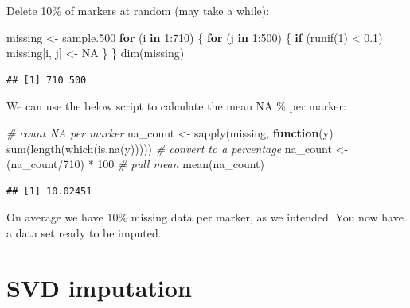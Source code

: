 \documentclass[
]{book}
\newenvironment{Shaded}{\begin{snugshade}}{\end{snugshade}}
\newcommand{\CommentTok}[1]{\textcolor[rgb]{0.56,0.35,0.01}{\textit{#1}}}
\newcommand{\ConstantTok}[1]{\textcolor[rgb]{0.00,0.00,0.00}{#1}}
\newcommand{\ControlFlowTok}[1]{\textcolor[rgb]{0.13,0.29,0.53}{\textbf{#1}}}
\newcommand{\DecValTok}[1]{\textcolor[rgb]{0.00,0.00,0.81}{#1}}
\newcommand{\FloatTok}[1]{\textcolor[rgb]{0.00,0.00,0.81}{#1}}
\newcommand{\FunctionTok}[1]{\textcolor[rgb]{0.00,0.00,0.00}{#1}}
\newcommand{\NormalTok}[1]{#1}
\newcommand{\OtherTok}[1]{\textcolor[rgb]{0.56,0.35,0.01}{#1}}
\newcommand{\SpecialCharTok}[1]{\textcolor[rgb]{0.00,0.00,0.00}{#1}}
\begin{document}
Delete 10\% of markers at random (may take a while):

\begin{Shaded}
\begin{Highlighting}[]
\NormalTok{missing }\OtherTok{\textless{}{-}}\NormalTok{ sample}\FloatTok{.500}
\ControlFlowTok{for}\NormalTok{ (i }\ControlFlowTok{in} \DecValTok{1}\SpecialCharTok{:}\DecValTok{710}\NormalTok{) \{}
    \ControlFlowTok{for}\NormalTok{ (j }\ControlFlowTok{in} \DecValTok{1}\SpecialCharTok{:}\DecValTok{500}\NormalTok{) \{}
        \ControlFlowTok{if}\NormalTok{ (}\FunctionTok{runif}\NormalTok{(}\DecValTok{1}\NormalTok{) }\SpecialCharTok{\textless{}} \FloatTok{0.1}\NormalTok{) }
\NormalTok{            missing[i, j] }\OtherTok{\textless{}{-}} \ConstantTok{NA}
\NormalTok{    \}}
\NormalTok{\}}
\FunctionTok{dim}\NormalTok{(missing)}
\end{Highlighting}
\end{Shaded}

\begin{verbatim}
## [1] 710 500
\end{verbatim}

We can use the below script to calculate the mean NA \% per marker:

\begin{Shaded}
\begin{Highlighting}[]
\CommentTok{\# count NA per marker}
\NormalTok{na\_count }\OtherTok{\textless{}{-}} \FunctionTok{sapply}\NormalTok{(missing, }\ControlFlowTok{function}\NormalTok{(y) }\FunctionTok{sum}\NormalTok{(}\FunctionTok{length}\NormalTok{(}\FunctionTok{which}\NormalTok{(}\FunctionTok{is.na}\NormalTok{(y)))))}
\CommentTok{\# convert to a percentage}
\NormalTok{na\_count }\OtherTok{\textless{}{-}}\NormalTok{ (na\_count}\SpecialCharTok{/}\DecValTok{710}\NormalTok{) }\SpecialCharTok{*} \DecValTok{100}
\CommentTok{\# pull mean}
\FunctionTok{mean}\NormalTok{(na\_count)}
\end{Highlighting}
\end{Shaded}

\begin{verbatim}
## [1] 10.02451
\end{verbatim}

On average we have 10\% missing data per marker, as we intended. You now have a data set ready to be imputed.

\hypertarget{svd-imputation}{%
\section{SVD imputation}\label{svd-imputation}}
\end{document}
